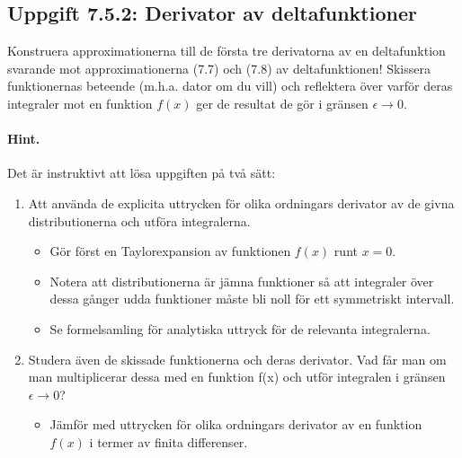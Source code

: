 \documentclass[%
oneside,                 %
final,                   %
10pt]{article}
\newenvironment{doconceexercise}{}{}
\newcounter{doconceexercisecounter}
\begin{document}
\begin{doconceexercise}

\subsection{Uppgift 7.5.2: Derivator av deltafunktioner}

Konstruera approximationerna till de första tre derivatorna av en deltafunktion svarande mot approximationerna (7.7) och (7.8) av deltafunktionen! Skissera funktionernas beteende (m.h.a. dator om du vill) och reflektera över varför deras integraler 
mot en funktion $f(x)$ ger de resultat de gör i gränsen $\epsilon \rightarrow 0$.


\paragraph{Hint.}
Det är instruktivt att lösa uppgiften på två sätt:
\begin{enumerate}
\item Att använda de explicita uttrycken för olika ordningars derivator av de givna distributionerna och utföra integralerna. 
\begin{itemize}

  \item Gör först en Taylorexpansion av funktionen $f(x)$ runt $x=0$.

  \item Notera att distributionerna är jämna funktioner så att integraler över dessa gånger udda funktioner måste bli noll för ett symmetriskt intervall.

  \item Se formelsamling för analytiska uttryck för de relevanta integralerna.

\end{itemize}

\noindent
\item Studera även de skissade funktionerna och deras derivator. Vad får man om man multiplicerar dessa med en funktion f(x) och utför integralen i gränsen $\epsilon \to 0$?
\begin{itemize}

  \item Jämför med uttrycken för olika ordningars derivator av en funktion $f(x)$ i termer av finita differenser.
\end{itemize}


\end{enumerate}
\end{doconceexercise}
\end{document}
